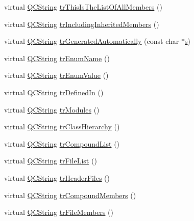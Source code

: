 \begin{DoxyCompactItemize}
\item 
virtual \hyperlink{class_q_c_string}{Q\+C\+String} \hyperlink{class_translator_arabic_ae6459d640e8d75ca221d49d248909758}{tr\+This\+Is\+The\+List\+Of\+All\+Members} ()
\item 
virtual \hyperlink{class_q_c_string}{Q\+C\+String} \hyperlink{class_translator_arabic_af27177157cd20751ef1bfbb2ac8186cf}{tr\+Including\+Inherited\+Members} ()
\item 
virtual \hyperlink{class_q_c_string}{Q\+C\+String} \hyperlink{class_translator_arabic_a5dd76439e7f830bd9384a1a48ffdd12d}{tr\+Generated\+Automatically} (const char $\ast$\hyperlink{060__command__switch_8tcl_a011c73f2dbb87635a3b4206c72355f6e}{s})
\item 
virtual \hyperlink{class_q_c_string}{Q\+C\+String} \hyperlink{class_translator_arabic_a52b5269a3a05a149a3320d3ade072ec9}{tr\+Enum\+Name} ()
\item 
virtual \hyperlink{class_q_c_string}{Q\+C\+String} \hyperlink{class_translator_arabic_ae9b4ecec9913389fea6432dc2171afb5}{tr\+Enum\+Value} ()
\item 
virtual \hyperlink{class_q_c_string}{Q\+C\+String} \hyperlink{class_translator_arabic_a58eecd6376efdc45deb1b9154c7130e1}{tr\+Defined\+In} ()
\item 
virtual \hyperlink{class_q_c_string}{Q\+C\+String} \hyperlink{class_translator_arabic_a3b3d2c2a89ac09a21da233223676a26f}{tr\+Modules} ()
\item 
virtual \hyperlink{class_q_c_string}{Q\+C\+String} \hyperlink{class_translator_arabic_ab0007c6202f51fdafa65ef7a92852660}{tr\+Class\+Hierarchy} ()
\item 
virtual \hyperlink{class_q_c_string}{Q\+C\+String} \hyperlink{class_translator_arabic_a2bdcaaf56978992febf487f7721ca050}{tr\+Compound\+List} ()
\item 
virtual \hyperlink{class_q_c_string}{Q\+C\+String} \hyperlink{class_translator_arabic_a5524b85023dedf84436fb7fabb517f1d}{tr\+File\+List} ()
\item 
virtual \hyperlink{class_q_c_string}{Q\+C\+String} \hyperlink{class_translator_arabic_a2e6a79881591570625da5a0527f0eb8f}{tr\+Header\+Files} ()
\item 
virtual \hyperlink{class_q_c_string}{Q\+C\+String} \hyperlink{class_translator_arabic_a83e2c9dec5c0946efa2aae772d953b81}{tr\+Compound\+Members} ()
\item 
virtual \hyperlink{class_q_c_string}{Q\+C\+String} \hyperlink{class_translator_arabic_a92d2b70c24f76e57bbc85c1a319e2f9b}{tr\+File\+Members} ()

\end{DoxyCompactItemize}
